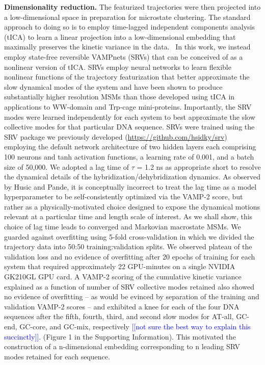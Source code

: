 \documentclass[journal=jpcbfk,manuscript=article]{achemso}
\newcommand*{\noteb}[1]{\textcolor{blue}{[[#1]]}}		%
\begin{document}
\textbf{Dimensionality reduction.} The featurized trajectories were then projected into a low-dimensional space in preparation for microstate clustering. The standard approach to doing so is to employ time-lagged independent components analysis (tICA) to learn a linear projection into a low-dimensional embedding that maximally preserves the kinetic variance in the data.~\citep{Perez-Hernandez2013IdentificationConstruction, Schwantes2013ImprovementsNTL9, Noe2015KineticSimulation} In this work, we instead employ state-free reversible VAMPnets (SRVs) that can be conceived of as a nonlinear version of tICA. \citep{Chen} SRVs employ neural networks to learn flexible nonlinear functions of the trajectory featurization that better approximate the slow dynamical modes of the system and have been shown to produce substantially higher resolution MSMs than those developed using tICA in applications to WW-domain and Trp-cage mini-proteins.\citep{Chen, Sidky} Importantly, the SRV modes were learned independently for each system to best approximate the slow collective modes for that particular DNA sequence. SRVs were trained using the SRV package we previously developed (\url{https://github.com/hsidky/srv}) employing the default network architecture of two hidden layers each comprising 100 neurons and tanh activation functions, a learning rate of 0.001, and a batch size of 50,000. We adopted a lag time of $\tau$ = 1.2 ns as appropriate short to resolve the dynamical details of the hybridization/dehybridization dynamics. \citep{Phys2018MarkovValidation} As observed by Husic and Pande, it is conceptually incorrect to treat the lag time as a model hyperparameter to be self-consistently optimized via the VAMP-2 score, but rather as a physically-motivated choice designed to expose the dynamical motions relevant at a particular time and length scale of interest. \citep{Husic2017Note:Selection} As we shall show, this choice of lag time leads to converged and Markovian macrostate MSMs. We guarded against overfitting using 5-fold cross-validation in which we divided the trajectory data into 50:50 training:validation splits. We observed plateau of the validation loss and no evidence of overfitting after 20 epochs of training for each system that required approximately 22 GPU-minutes on a single NVIDIA GK210GL GPU card. A VAMP-2 scoring of the cumulative kinetic variance explained as a function of number of SRV collective modes retained also showed no evidence of overfitting -- as would be evinced by separation of the training and validation VAMP-2 scores \citep{Sidky} -- and exhibited a knee for each of the four DNA sequences after the fifth, fourth, third, and second slow modes for AT-all, GC-end, GC-core, and GC-mix, respectively \noteb{not sure the best way to explain this succinctly}. (Figure 1 in the Supporting Information). This motivated the construction of a n-dimensional embedding corresponding to n leading SRV modes retained for each sequence.
\end{document}

